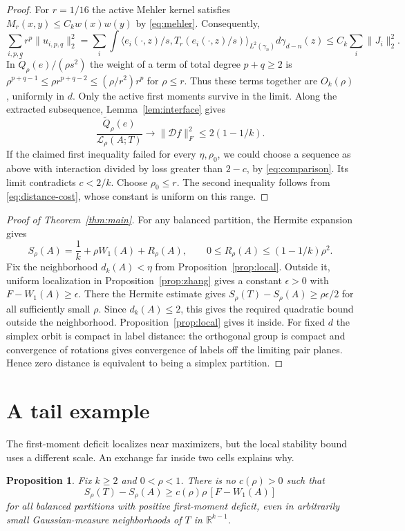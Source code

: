 \documentclass[11pt,reqno]{amsart}
\newtheorem{proposition}[theorem]{Proposition}
\newcommand{\R}{\mathbb R}
\newcommand{\norm}[1]{\lVert #1\rVert}
\newcommand{\ga}{\gamma}
\newcommand{\LL}{\mathcal L}
\newcommand{\DD}{\mathcal D}
\begin{document}
\begin{proof}
For $r=1/16$ the active Mehler kernel satisfies
$M_r(x,y)\le C_k w(x)w(y)$ by \eqref{eq:mehler}. Consequently,
\[
 \sum_{i,p,q} r^p\norm{u_{i,p,q}}_2^2
 =\sum_i\int\big\langle e_i(\cdot,z)/s,
                 T_r(e_i(\cdot,z)/s)\big\rangle_{L^2(\ga_n)}
            d\ga_{d-n}(z)
 \le C_k\sum_i\norm{J_i}_2^2.
\]
In $\widetilde Q_\rho(e)/(\rho s^2)$ the weight of a term of total
degree $p+q\ge2$ is
$\rho^{p+q-1}\le \rho r^{p+q-2}\le(\rho/r^2)r^p$ for $\rho\le r$.
Thus these terms together are $O_k(\rho)$, uniformly in $d$.
Only the active first moments survive in the limit.
Along the extracted subsequence, Lemma~\ref{lem:interface} gives
\[
 \frac{\widetilde Q_\rho(e)}{\LL_\rho(A;T)}
      \longrightarrow\norm{\DD f}_F^2\le 2(1-1/k).
\]
If the claimed first inequality failed for every $\eta,\rho_0$, we
could choose a sequence as above with interaction divided by loss
greater than $2-c$, by \eqref{eq:comparison}. Its limit contradicts
$c<2/k$. Choose $\rho_0\le r$. The second inequality follows from
\eqref{eq:distance-cost}, whose constant is uniform on this range.
\end{proof}

\begin{proof}[Proof of Theorem~\ref{thm:main}]
For any balanced partition, the Hermite expansion gives
\[
 S_\rho(A)=\frac1k+\rho W_1(A)+R_\rho(A),\qquad
 0\le R_\rho(A)\le(1-1/k)\rho^2 .
\]
Fix the neighborhood $d_k(A)<\eta$ from Proposition~\ref{prop:local}.
Outside it, uniform localization in Proposition~\ref{prop:zhang}
gives a constant $\epsilon>0$ with $F-W_1(A)\ge\epsilon$. There the
Hermite estimate gives $S_\rho(T)-S_\rho(A)\ge\rho\epsilon/2$ for all
sufficiently small $\rho$. Since $d_k(A)\le2$, this gives the required
quadratic bound outside the neighborhood. Proposition~\ref{prop:local}
gives it inside. For fixed $d$ the simplex orbit is compact in label
distance: the orthogonal group is compact and convergence of rotations
gives convergence of labels off the limiting pair planes. Hence zero
distance is equivalent to being a simplex partition.
\end{proof}

\section{A tail example}

The first-moment deficit localizes near maximizers, but the local
stability bound uses a different scale. An exchange far inside two
cells explains why.

\begin{proposition}\label{prop:obstruction}
Fix $k\ge2$ and $0<\rho<1$. There is no $c(\rho)>0$ such that
\[
 S_\rho(T)-S_\rho(A)\ge c(\rho)\rho\,[F-W_1(A)]
\]
for all balanced partitions with positive first-moment deficit, even in
arbitrarily small Gaussian-measure neighborhoods of $T$ in $\R^{k-1}$.
\end{proposition}
\end{document}
